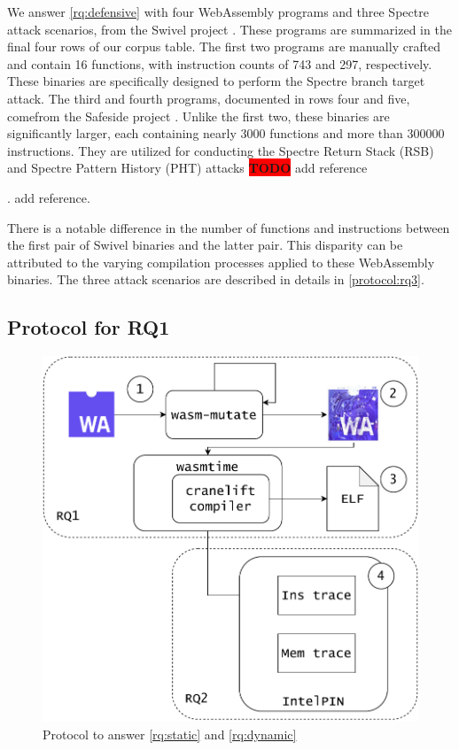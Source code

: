 \documentclass[sigplan,screen]{acmart}
\newcommand*\badge[1]{ \colorbox{red}{\color{white}#1}}
\newcommand{\Wasm}{WebAssembly\xspace}
\newcommand{\todo}[1]{%
\refstepcounter{todo}
\noindent\textbf{\badge{TODO}} {\color{red}#1}
\addcontentsline{td}{todo}
{\color{red}\thesection.\thetodo\xspace #1}}
\begin{document}
We answer \ref{rq:defensive} with four \Wasm programs and three Spectre attack scenarios, from the Swivel project \cite{Swivel}. 
These programs are summarized in the final four rows of our corpus table.
The first two programs are manually crafted and contain 16 functions, with instruction counts of 743 and 297, respectively. These binaries are specifically designed to perform the Spectre branch target attack.
The third and fourth programs, documented in rows four and five, comefrom the Safeside project \cite{safeside}. 
Unlike the first two, these binaries are significantly larger, each containing nearly 3000 functions and more than 300000 instructions. 
They are utilized for conducting the Spectre Return Stack (RSB) and Spectre Pattern History (PHT) attacks \todo{add reference}.

There is a notable difference in the number of functions and instructions between the first pair of Swivel binaries and the latter pair. 
This disparity can be attributed to the varying compilation processes applied to these \Wasm binaries. 
The three attack scenarios are described in details in \autoref{protocol:rq3}.

\subsection{Protocol for RQ1}
\label{protocol:rq1}

\begin{figure}
    \centering
    \includegraphics[width=0.8\linewidth]{figures/protocol.pdf}
    \caption{Protocol to answer \ref{rq:static} and \ref{rq:dynamic}}
  \label{protocol}
\end{figure}
\end{document}
